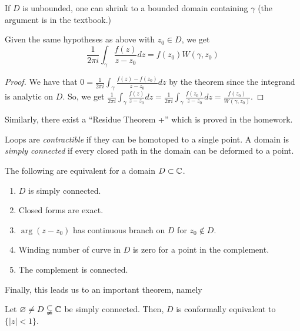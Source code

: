 \documentclass[11pt,leqno,oneside]{amsart}
\numberwithin{thm}{section}
\begin{document}
  If $D$ is unbounded, one can shrink to a bounded domain containing
  $\gamma$ (the argument is in the textbook.)
  \begin{cor}
    Given the same hypotheses as above with $z_0 \in D$, we get \[
      \frac{1}{2\pi i}\int_\gamma \frac{f(z)}{z-z_0}dz = f(z_0)W(\gamma,z_0)
    \]
  \end{cor}
  \begin{proof}
    We have that $0 = \frac{1}{2\pi i} \int_\gamma
    \frac{f(z)-f(z_0)}{z-z_0}dz$ by the theorem since the integrand is
    analytic on $D$. So, we get $\frac{1}{2\pi i} \int_\gamma
    \frac{f(z)}{z-z_0}dz = \frac{1}{2\pi i} \int_\gamma
    \frac{f(z_0)}{z-z_0} dz = \frac{f(z_0)}{W(\gamma,z_0)}$.
  \end{proof}
  Similarly, there exist a ``Residue Theorem +'' which is proved in
  the homework.
  \begin{defn}
    Loops are \emph{contractible} if they can be homotoped to a single
    point. A domain is \emph{simply connected} if every closed path in
    the domain can be deformed to a point.
  \end{defn}
  \begin{thm}
    The following are equivalent for a domain $D \subset {\mathbb C}$.
    \begin{enumerate}
    \item $D$ is simply connected.
    \item Closed forms are exact.
    \item $\arg(z-z_0)$ has continuous branch on $D$ for $z_0 \not \in
      D$.
    \item Winding number of curve in $D$ is zero for a point in the
      complement.
    \item The complement is connected.
    \end{enumerate}
  \end{thm}
  Finally, this leads us to an important theorem, namely
  \begin{thm}
    Let $\varnothing \neq D \subsetneqq {\mathbb C}$ be simply connected. Then,
    $D$ is conformally equivalent to $\{|z| < 1\}.$
  \end{thm}
\end{document}
